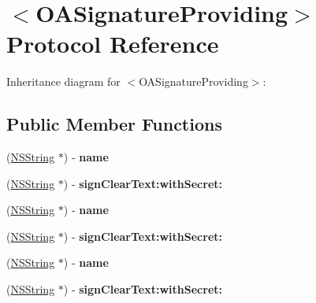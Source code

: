 \hypertarget{protocol_o_a_signature_providing-p}{
\section{$<$\-O\-A\-Signature\-Providing$>$ \-Protocol \-Reference}
\label{protocol_o_a_signature_providing-p}
}


\-Inheritance diagram for $<$\-O\-A\-Signature\-Providing$>$\-:
\subsection*{\-Public \-Member \-Functions}
\begin{DoxyCompactItemize}
\item 
\hypertarget{protocol_o_a_signature_providing-p_aa17ec0d8554962d3a5b888277397121d}{
(\hyperlink{class_n_s_string}{\-N\-S\-String} $\ast$) -\/ {\bfseries name}}
\label{protocol_o_a_signature_providing-p_aa17ec0d8554962d3a5b888277397121d}

\item 
\hypertarget{protocol_o_a_signature_providing-p_ae8179b9ae1f4b26400ac5b6cbff7323a}{
(\hyperlink{class_n_s_string}{\-N\-S\-String} $\ast$) -\/ {\bfseries sign\-Clear\-Text\-:with\-Secret\-:}}
\label{protocol_o_a_signature_providing-p_ae8179b9ae1f4b26400ac5b6cbff7323a}

\item 
\hypertarget{protocol_o_a_signature_providing-p_aa17ec0d8554962d3a5b888277397121d}{
(\hyperlink{class_n_s_string}{\-N\-S\-String} $\ast$) -\/ {\bfseries name}}
\label{protocol_o_a_signature_providing-p_aa17ec0d8554962d3a5b888277397121d}

\item 
\hypertarget{protocol_o_a_signature_providing-p_ae8179b9ae1f4b26400ac5b6cbff7323a}{
(\hyperlink{class_n_s_string}{\-N\-S\-String} $\ast$) -\/ {\bfseries sign\-Clear\-Text\-:with\-Secret\-:}}
\label{protocol_o_a_signature_providing-p_ae8179b9ae1f4b26400ac5b6cbff7323a}

\item 
\hypertarget{protocol_o_a_signature_providing-p_aa17ec0d8554962d3a5b888277397121d}{
(\hyperlink{class_n_s_string}{\-N\-S\-String} $\ast$) -\/ {\bfseries name}}
\label{protocol_o_a_signature_providing-p_aa17ec0d8554962d3a5b888277397121d}

\item 
\hypertarget{protocol_o_a_signature_providing-p_ae8179b9ae1f4b26400ac5b6cbff7323a}{
(\hyperlink{class_n_s_string}{\-N\-S\-String} $\ast$) -\/ {\bfseries sign\-Clear\-Text\-:with\-Secret\-:}}
\label{protocol_o_a_signature_providing-p_ae8179b9ae1f4b26400ac5b6cbff7323a}

\end{DoxyCompactItemize}


